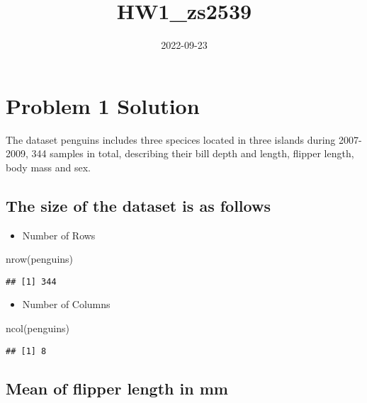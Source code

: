 \documentclass[
]{article}
\title{HW1\_zs2539}
\author{}
\date{\vspace{-2.5em}2022-09-23}
\newenvironment{Shaded}{\begin{snugshade}}{\end{snugshade}}
\newcommand{\FunctionTok}[1]{\textcolor[rgb]{0.00,0.00,0.00}{#1}}
\newcommand{\NormalTok}[1]{#1}
\providecommand{\tightlist}{%
  \setlength{\itemsep}{0pt}\setlength{\parskip}{0pt}}
\begin{document}
\maketitle

\hypertarget{problem-1-solution}{%
\section{Problem 1 Solution}\label{problem-1-solution}}

The dataset penguins includes three specices located in three islands
during 2007-2009, 344 samples in total, describing their bill depth and
length, flipper length, body mass and sex.

\hypertarget{the-size-of-the-dataset-is-as-follows}{%
\subsection{The size of the dataset is as
follows}\label{the-size-of-the-dataset-is-as-follows}}

\begin{itemize}
\tightlist
\item
  Number of Rows
\end{itemize}

\begin{Shaded}
\begin{Highlighting}[]
\FunctionTok{nrow}\NormalTok{(penguins)}
\end{Highlighting}
\end{Shaded}

\begin{verbatim}
## [1] 344
\end{verbatim}

\begin{itemize}
\tightlist
\item
  Number of Columns
\end{itemize}

\begin{Shaded}
\begin{Highlighting}[]
\FunctionTok{ncol}\NormalTok{(penguins)}
\end{Highlighting}
\end{Shaded}

\begin{verbatim}
## [1] 8
\end{verbatim}

\hypertarget{mean-of-flipper-length-in-mm}{%
\subsection{Mean of flipper length in
mm}\label{mean-of-flipper-length-in-mm}}
\end{document}
